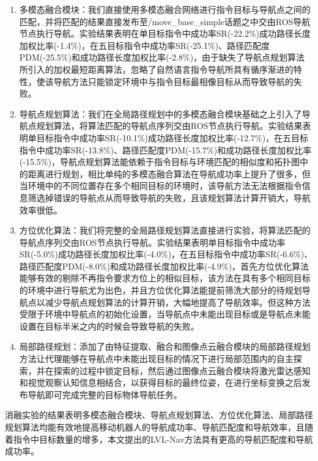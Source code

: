 \begin{enumerate}[topsep = 0 pt, itemsep= 0 pt, parsep=0pt, partopsep=0pt, leftmargin=44pt, itemindent=0pt, labelsep=6pt, label=(\arabic*)]
    \item 	多模态融合模块：我们直接使用多模态融合网络进行指令目标与导航点之间的匹配，并将匹配的结果直接发布至/move\_base\_simple话题之中交由ROS导航节点执行导航。实验结果表明在单目标指令中成功率SR(-22.2\%)成功路径长度加权比率(-1.4\%)，在五目标指令中成功率SR(-25.1\%)、路径匹配度PDM(-25.5\%)和成功路径长度加权比率(-2.8\%)，由于缺失了导航点规划算法所引入的加权最短距离算法，忽略了自然语言指令导航所具有循序渐进的特性，使该导航方法只能锁定环境中与指令目标最相像目标从而导致导航的失败。
    \item	导航点规划算法：我们在全局路径规划中的多模态融合模块基础之上引入了导航点规划算法，将算法匹配的导航点序列交由ROS节点执行导航。实验结果表明单目标指令中成功率SR(-10.1\%)成功路径长度加权比率(-12.7\%)，在五目标指令中成功率SR(-13.8\%)、路径匹配度PDM(-15.7\%)和成功路径长度加权比率(-15.5\%)，导航点规划算法能依赖于指令目标与环境匹配的相似度和拓扑图中的距离进行规划，相比单纯的多模态融合算法在导航成功率上提升了很多，但当环境中的不同位置存在多个相同目标的环境时，该导航方法无法根据指令信息筛选掉错误的导航点从而导致导航的失败，且该规划算法计算开销大，导航效率很低。
    \item   方位优化算法：我们将完整的全局路径规划算法直接进行实验，将算法匹配的导航点序列交由ROS节点执行导航。实验结果表明单目标指令中成功率SR(-5.0\%)成功路径长度加权比率(-4.0\%)，在五目标指令中成功率SR(-6.6\%)、路径匹配度PDM(-8.0\%)和成功路径长度加权比率(-4.9\%)，首先方位优化算法能够有效的剔除不再指令要求方位上的相似目标，该方法在具有多个相同目标的环境中进行导航尤为出色，并且方位优化算法能提前筛洗大部分的待规划导航点以减少导航点规划算法的计算开销，大幅地提高了导航效率。但这种方法受限于环境中导航点的初始化设置，当导航点中未能出现目标或是导航点未能设置在目标半米之内的时候会导致导航的失败。
    \item   局部路径规划：添加了由特征提取、融合和图像点云融合模块的局部路径规划方法让代理能够在导航点中未能出现目标的情况下进行局部范围内的自主探索，并在探索的过程中锁定目标，然后通过图像点云融合模块将激光雷达感知和视觉观察认知信息相结合，以获得目标的最终位姿，在进行坐标变换之后发布导航即可完成完整的目标物体导航任务。
\end{enumerate}

消融实验的结果表明多模态融合模块、导航点规划算法、方位优化算法、局部路径规划算法均能有效地提高移动机器人的导航成功率、导航匹配度和导航效率，且随着指令中目标数量的增多，本文提出的LVL-Nav方法具有更高的导航匹配度和导航成功率。


